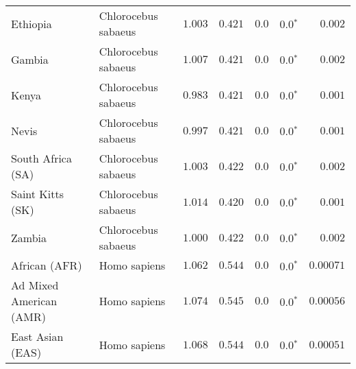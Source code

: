\begin{center}
\begin{adjustbox}{width = 1\textwidth}
\begin{tabular}{|l|l|r|r|r|r|r|}
                       Ethiopia &  Chlorocebus sabaeus &                                           $ 1.003$ &                                           $ 0.421$ &            $0.0$ &                  $\bm{0.0{^*}}$ &           $ 0.002$ \\
                         Gambia &  Chlorocebus sabaeus &                                           $ 1.007$ &                                           $ 0.421$ &            $0.0$ &                  $\bm{0.0{^*}}$ &           $ 0.002$ \\
                          Kenya &  Chlorocebus sabaeus &                                           $ 0.983$ &                                           $ 0.421$ &            $0.0$ &                  $\bm{0.0{^*}}$ &           $ 0.001$ \\
                          Nevis &  Chlorocebus sabaeus &                                           $ 0.997$ &                                           $ 0.421$ &            $0.0$ &                  $\bm{0.0{^*}}$ &           $ 0.001$ \\
              South Africa (SA) &  Chlorocebus sabaeus &                                           $ 1.003$ &                                           $ 0.422$ &            $0.0$ &                  $\bm{0.0{^*}}$ &           $ 0.002$ \\
               Saint Kitts (SK) &  Chlorocebus sabaeus &                                           $ 1.014$ &                                           $ 0.420$ &            $0.0$ &                  $\bm{0.0{^*}}$ &           $ 0.001$ \\
                         Zambia &  Chlorocebus sabaeus &                                           $ 1.000$ &                                           $ 0.422$ &            $0.0$ &                  $\bm{0.0{^*}}$ &           $ 0.002$ \\
                  African (AFR) &         Homo sapiens &                                           $ 1.062$ &                                           $ 0.544$ &            $0.0$ &                  $\bm{0.0{^*}}$ &          $0.00071$ \\
        Ad Mixed American (AMR) &         Homo sapiens &                                           $ 1.074$ &                                           $ 0.545$ &            $0.0$ &                  $\bm{0.0{^*}}$ &          $0.00056$ \\
               East Asian (EAS) &         Homo sapiens &                                           $ 1.068$ &                                           $ 0.544$ &            $0.0$ &                  $\bm{0.0{^*}}$ &          $0.00051$ \\

\end{tabular}
\end{adjustbox}
\end{center}
